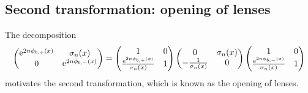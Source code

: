 \documentclass[reqno,a4paper,11pt]{amsart}
\DeclareMathOperator{\ee}{\rm e}
\theoremstyle{definition}
\theoremstyle{remark}
\numberwithin{equation}{section}
\begin{document}
\subsection{Second transformation: opening of lenses}\hfill 

    
    The decomposition
    \[
        \begin{pmatrix}
            \ee^{2n \phi_{b,+}(x)} &   \sigma_n(x) \\
            0   &   \ee^{2n \phi_{b,-}(x)}
        \end{pmatrix}
        =
        \begin{pmatrix}
            1   &   0   \\
            \frac{\ee^{2n \phi_{b,+}(x)}}{\sigma_n(x)}  &   1
        \end{pmatrix}
        \begin{pmatrix}
            0   &   \sigma_n(x) \\
            - \frac{1}{\sigma_n(x)} &   0
        \end{pmatrix}
        \begin{pmatrix}
            1   &   0   \\
            \frac{\ee^{2n \phi_{b,-}(x)}}{\sigma_n(x)} &   1
        \end{pmatrix}
    \]
    motivates the second transformation, which is known as the opening of lenses.
\end{document}

